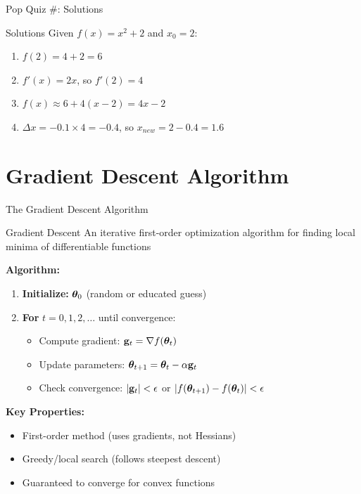 \documentclass[usenames,dvipsnames]{beamer}
\begin{document}
  \begin{frame}{Pop Quiz \#\thepopquiz: Solutions}
    \begin{examplebox}{Solutions}
    Given $f(x) = x^2 + 2$ and $x_0 = 2$:
    \begin{enumerate}
        \item $f(2) = 4 + 2 = 6$
        \item $f'(x) = 2x$, so $f'(2) = 4$
        \item $f(x) \approx 6 + 4(x-2) = 4x - 2$
        \item $\Delta x = -0.1 \times 4 = -0.4$, so $x_{new} = 2 - 0.4 = 1.6$
    \end{enumerate}
    \end{examplebox}
  \end{frame}

  \section{Gradient Descent Algorithm}

  \begin{frame}{The Gradient Descent Algorithm}
    \begin{definitionbox}{Gradient Descent}
    An iterative first-order optimization algorithm for finding local minima of differentiable functions
    \end{definitionbox}
    
    \pause
    \textbf{Algorithm:}
    \begin{enumerate}[<+->]
        \item \textbf{Initialize:} $\boldsymbol{\theta}_0$ (random or educated guess)
        \item \textbf{For} $t = 0, 1, 2, \ldots$ until convergence:
        \begin{itemize}
            \item Compute gradient: $\mathbf{g}_t = \nabla f(\boldsymbol{\theta}_t)$
            \item Update parameters: $\boldsymbol{\theta}_{t+1} = \boldsymbol{\theta}_t - \alpha \mathbf{g}_t$
            \item Check convergence: $|\mathbf{g}_t| < \epsilon$ or $|f(\boldsymbol{\theta}_{t+1}) - f(\boldsymbol{\theta}_t)| < \epsilon$
        \end{itemize}
    \end{enumerate}
    
    \pause
    \begin{keypointsbox}
    \textbf{Key Properties:}
    \begin{itemize}
        \item First-order method (uses gradients, not Hessians)
        \item Greedy/local search (follows steepest descent)
        \item Guaranteed to converge for convex functions
    \end{itemize}
    \end{keypointsbox}
  \end{frame}
\end{document}
